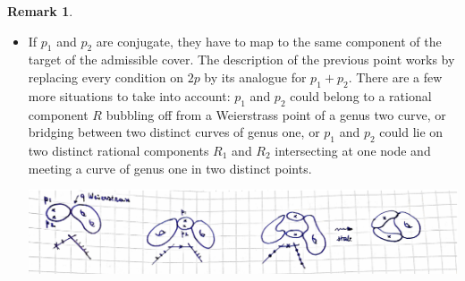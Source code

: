 \documentclass[11pt]{amsart}
\theoremstyle{plain}
\theoremstyle{definition}
\newtheorem{rem}[thm]{Remark}
\begin{document}
\begin{rem}
\begin{itemize}[leftmargin=.5cm]
  \item If $p_1$ and $p_2$ are conjugate, they have to map to the same component of the target of the admissible cover. The description of the previous point works by replacing every condition on $2p$ by its analogue for $p_1+p_2$.  There are a few more situations to take into account: $p_1$ and $p_2$ could belong to a rational component $R$ bubbling off from a Weierstrass point of a genus two curve, or bridging between two distinct curves of genus one, or $p_1$ and $p_2$ could lie on two distinct rational components $R_1$ and $R_2$ intersecting at one node and meeting a curve of genus one in two distinct points.
  \begin{center}
 \includegraphics[width=.8\textwidth]{admissible_conjugate}  
  \end{center}

 \end{itemize}
\end{rem}
\end{document}
